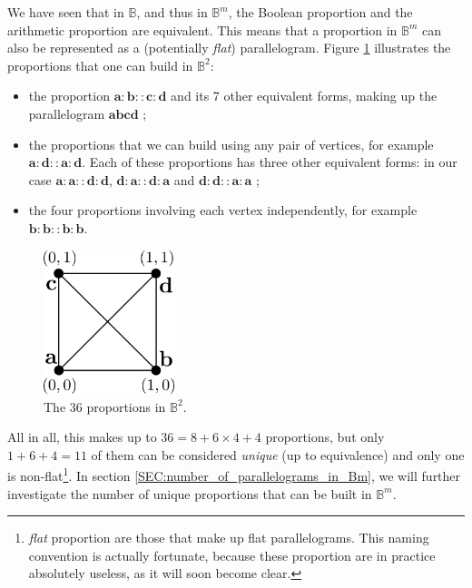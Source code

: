 We have seen that in $\mathbb{B}$, and thus in $\mathbb{B}^m$, the Boolean
proportion and the arithmetic proportion are equivalent. This means that a
proportion in $\mathbb{B}^m$ can also be represented as a (potentially
\textit{flat}) parallelogram.
Figure \ref{FIG:proportions_in_B2} illustrates the proportions that one can
build in $\mathbb{B}^2$:
\begin{itemize}
  \item the proportion $\mathbf{a}: \mathbf{b} :: \mathbf{c} : \mathbf{d}$ and
    its 7 other equivalent forms, making up the parallelogram
    $\mathbf{a}\mathbf{b}\mathbf{c}\mathbf{d}$ ;
  \item the proportions that we can build using any pair of vertices, for
    example $\mathbf{a} : \mathbf{d} :: \mathbf{a} : \mathbf{d}$. Each of these
    proportions has three other equivalent forms: in our case $\mathbf{a} :
    \mathbf{a} :: \mathbf{d} : \mathbf{d}$, $\mathbf{d} : \mathbf{a} ::
    \mathbf{d} : \mathbf{a}$ and $\mathbf{d} : \mathbf{d} :: \mathbf{a} :
    \mathbf{a}$ ;
  \item the four proportions involving each vertex independently, for example
    $\mathbf{b}:\mathbf{b}::\mathbf{b}:\mathbf{b}$.
\end{itemize}

\begin{figure}[!h]
\centering
\includegraphics[width=1.5in]{figures/proportions_in_B2.pdf}
  \caption{The $36$ proportions in $\mathbb{B}^2$.}
\label{FIG:proportions_in_B2}
\end{figure}

All in all, this makes up to $36 = 8 + 6 \times 4 + 4$ proportions, but only $1
+ 6 + 4 = 11$ of them can be considered \textit{unique} (up to equivalence) and
only one is non-flat\footnote{\textit{flat} proportion are those that make up
flat parallelograms. This naming convention is actually fortunate, because
these proportion are in practice absolutely useless, as it will soon become
clear.}. In section \ref{SEC:number_of_parallelograms_in_Bm}, we will further
investigate the number of unique proportions that can be built in
$\mathbb{B}^m$.

